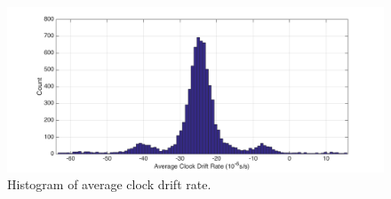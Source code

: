 \documentclass[11pt, oneside]{article}   	%
\begin{document}
\begin{figure}[ht] %
   \centering
   \includegraphics[width=6in]{../cdr.png} 
   \caption{Histogram of average clock drift rate.}
   \label{fig:cdr}
\end{figure}
\end{document}
